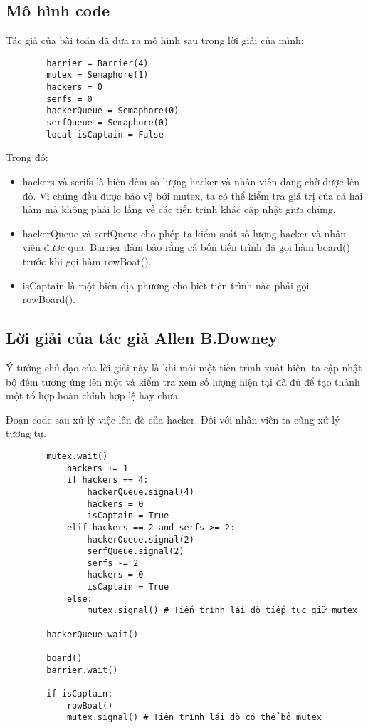 \documentclass[a4paper]{article}
\begin{document}
	\subsection{Mô hình code}

	Tác giả của bài toán đã đưa ra mô hình sau trong lời giải của mình:

	\begin{tcolorbox}
	\begin{verbatim}
		barrier = Barrier(4) 
		mutex = Semaphore(1) 
		hackers = 0 
		serfs = 0 
		hackerQueue = Semaphore(0) 
		serfQueue = Semaphore(0) 
		local isCaptain = False
	\end{verbatim}
	\end{tcolorbox}

	Trong đó:

	\begin{itemize}
		\item {hackers và serifs là biến đếm số lượng hacker và nhân viên đang chờ được lên đò.
			Vì chúng đều được bảo vệ bởi mutex, ta có thể kiểm tra giá trị của cả hai hàm mà 
			không phải lo lắng về các tiến trình khác cập nhật giữa chừng.}
		\item {hackerQueue và serfQueue cho phép ta kiểm soát số lượng hacker và nhân viên được 
			qua. Barrier đảm bảo rằng cả bốn tiến trình đã gọi hàm board() trước khi gọi hàm 
			rowBoat().}
		\item {isCaptain là một biến địa phương cho biết tiến trình nào phải gọi rowBoard().}
	\end{itemize}

	\subsection{Lời giải của tác giả Allen B.Downey}
	Ý tưởng chủ đạo của lời giải này là khi mỗi một tiến trình xuất hiện, ta cập nhật bộ đếm 
	tương ứng lên một và kiểm tra xem số lượng hiện tại đã đủ để tạo thành một tổ hợp hoàn chỉnh
	hợp lệ hay chưa.

	Đoạn code sau xử lý việc lên đò của hacker. Đối với nhân viên ta cũng xử lý tương tự.

	\begin{tcolorbox}
	\begin{verbatim}
		mutex.wait()
		    hackers += 1
		    if hackers == 4: 
		        hackerQueue.signal(4)
		        hackers = 0 
		        isCaptain = True 
		    elif hackers == 2 and serfs >= 2: 
		        hackerQueue.signal(2) 
		        serfQueue.signal(2) 
		        serfs -= 2 
		        hackers = 0 
		        isCaptain = True 
		    else:
		        mutex.signal() # Tiến trình lái đò tiếp tục giữ mutex 
		
		hackerQueue.wait() 
		
		board() 
		barrier.wait() 
		
		if isCaptain: 
		    rowBoat() 
		    mutex.signal() # Tiến trình lái đò có thể bỏ mutex 
	\end{verbatim}
	\end{tcolorbox}
	
\end{document}
